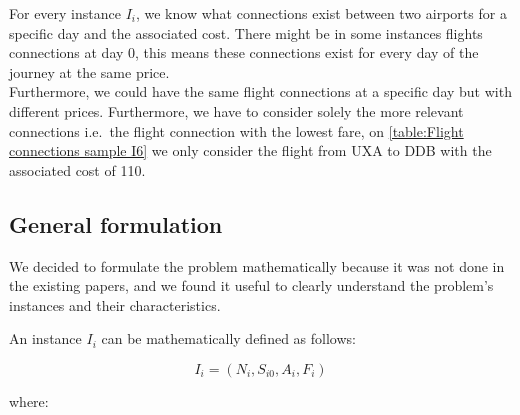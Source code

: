 For every instance $I_i$, we know what connections exist between two airports for a specific day and the associated cost.
There might be in some instances flights connections at day 0, this means these connections exist for every day of the journey at the same price.
\\Furthermore, we could have the same flight connections at a specific day but with different prices. Furthermore, we have to consider solely the more relevant connections i.e.\ the flight connection with the lowest fare, on \ref{table:Flight connections sample I6} we only consider the flight from UXA to DDB with the associated cost of 110.

\subsection{General formulation}
We decided to formulate the problem mathematically because it was not done in the existing papers, and we found it useful to clearly understand the problem's instances and their characteristics.


An instance \(I_i\) can be mathematically defined as follows:

\[
    I_i = (N_i, S_{i0}, A_{i}, F_{i})
\]

where:

